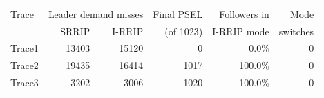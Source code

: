 \begin{tabular}{lrrrrr}\toprule
Trace & \multicolumn{2}{c}{Leader demand misses} & Final PSEL & Followers in & Mode \\
 & SRRIP & I-RRIP & (of 1023) & I-RRIP mode & switches \\ \midrule
Trace1 & 13403 & 15120 & 0 & 0.0\% & 0 \\
Trace2 & 19435 & 16414 & 1017 & 100.0\% & 0 \\
Trace3 & 3202 & 3006 & 1020 & 100.0\% & 0 \\
\bottomrule\end{tabular}
